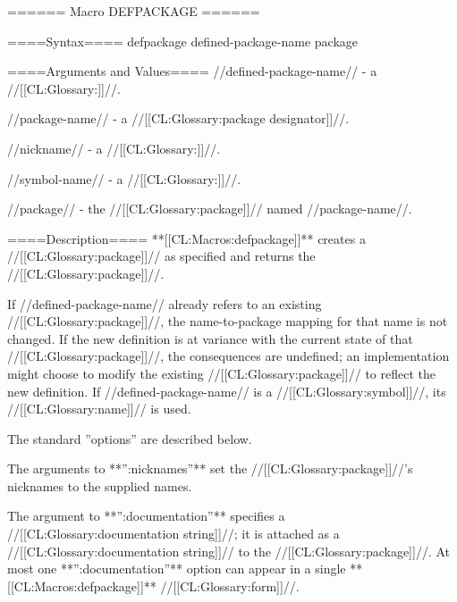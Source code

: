 ====== Macro DEFPACKAGE ======

====Syntax====
\DefmacWithValues defpackage {defined-package-name } {package}


====Arguments and Values====
//defined-package-name// - a //[[CL:Glossary:\packagenamedesignator]]//.

//package-name// - a //[[CL:Glossary:package designator]]//.

//nickname// - a //[[CL:Glossary:\packagenamedesignator]]//.

//symbol-name// - a //[[CL:Glossary:\symbolnamedesignator]]//.

//package// - the //[[CL:Glossary:package]]// named //package-name//.

====Description====
**[[CL:Macros:defpackage]]** creates a //[[CL:Glossary:package]]// as specified and returns the //[[CL:Glossary:package]]//.

If //defined-package-name// already refers to an existing //[[CL:Glossary:package]]//, the name-to-package mapping for that name is not changed. If the new definition is at variance with the current state of that //[[CL:Glossary:package]]//, the consequences are undefined; an implementation might choose to modify the existing //[[CL:Glossary:package]]// to reflect the new definition. If //defined-package-name// is a //[[CL:Glossary:symbol]]//, its //[[CL:Glossary:name]]// is used.

The standard ''options'' are described below.

\beginlist {}

The arguments to **'':nicknames''** set the //[[CL:Glossary:package]]//'s nicknames to the supplied names.




The argument to **'':documentation''** specifies a //[[CL:Glossary:documentation string]]//; it is attached as a //[[CL:Glossary:documentation string]]// to the //[[CL:Glossary:package]]//. At most one **'':documentation''** option can appear in a single **[[CL:Macros:defpackage]]** //[[CL:Glossary:form]]//.

